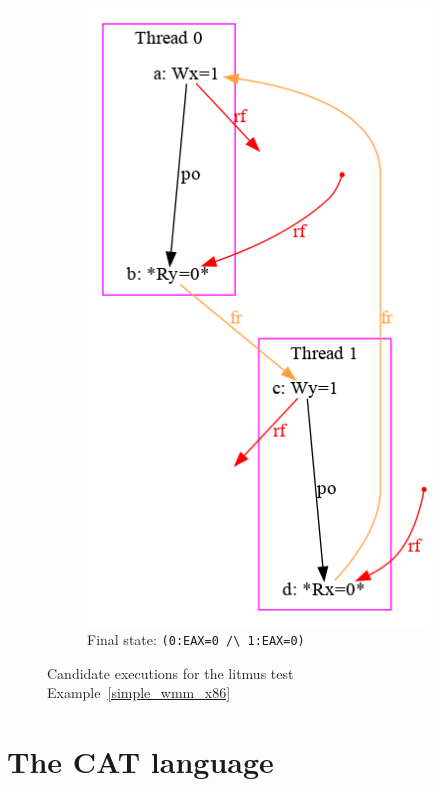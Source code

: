 \begin{figure}
\begin{subfigure}[t]{.23\textwidth}
  \includegraphics[width=.9\linewidth]{img/my/sb-example/SB-dot-4.png}
  \caption{Final state: \texttt{(0:EAX=0~/\textbackslash~1:EAX=0)}}
  \label{simple_wmm_x86_pic:sub4}
\end{subfigure}
\hfill
\caption{Candidate executions for the litmus test Example~\ref{simple_wmm_x86}}
\label{simple_wmm_x86_pic}
\end{figure}



\section{The CAT language}

